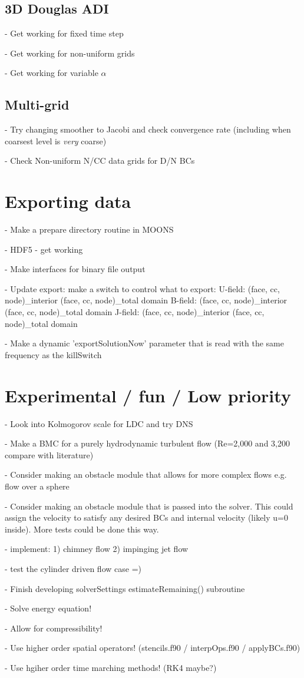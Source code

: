 \documentclass[11pt]{article}
\begin{document}
\subsection{3D Douglas ADI}
- Get working for fixed time step

- Get working for non-uniform grids

- Get working for variable $\alpha$

\subsection{Multi-grid}
- Try changing smoother to Jacobi and check convergence rate (including when coarsest level is \textit{very} coarse)

- Check Non-uniform N/CC data grids for D/N BCs

\section{Exporting data}
- Make a prepare directory routine in MOONS

- HDF5 - get working

- Make interfaces for binary file output

- Update export: make a switch to control what to export:
      U-field: (face, cc, node)\_interior (face, cc, node)\_total domain
      B-field: (face, cc, node)\_interior (face, cc, node)\_total domain
      J-field: (face, cc, node)\_interior (face, cc, node)\_total domain

- Make a dynamic 'exportSolutionNow' parameter that is read
with the same frequency as the killSwitch



\section{Experimental / fun / Low priority}
- Look into Kolmogorov scale for LDC and try DNS

- Make a BMC for a purely hydrodynamic turbulent flow (Re=2,000 and 3,200 compare with literature)

- Consider making an obstacle module that allows for more complex flows
e.g. flow over a sphere

- Consider making an obstacle module that is passed into the solver.
This could assign the velocity to satisfy any desired BCs and internal
velocity (likely u=0 inside). More tests could be done this way.

- implement: 1) chimney flow 2) impinging jet flow

- test the cylinder driven flow case =)

- Finish developing solverSettings estimateRemaining() subroutine

- Solve energy equation!

- Allow for compressibility!

- Use higher order spatial operators! (stencils.f90 / interpOps.f90 / applyBCs.f90)

- Use hgiher order time marching methods! (RK4 maybe?)
\end{document}
